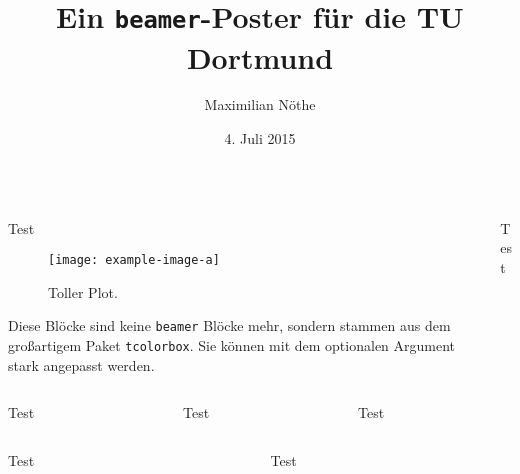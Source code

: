 \documentclass[t]{beamer}
\title{Ein \texttt{beamer}-Poster für die TU Dortmund}
\author{Maximilian Nöthe}
\date{4. Juli 2015}
\institute{%
  \texttt{[image: tudo.pdf]}%
}
\newlength{\thirdtextwidth}
\begin{document}
  \begin{columns}[onlytextwidth]%
    \begin{column}{0.5\textwidth}%
      \begin{block}[equal height group=A]{Test}%
        \begin{multicols}{2}
          \begin{figure}
            \texttt{[image: example-image-a]}\\
            \caption{Toller Plot.}
          \end{figure}
          \columnbreak
          Diese Blöcke sind keine \texttt{beamer} Blöcke mehr,
          sondern stammen aus dem großartigem Paket \texttt{tcolorbox}.
          Sie können mit dem optionalen Argument stark angepasst werden.
        \end{multicols}
      \end{block}%
    \end{column}%
    \begin{column}{0.5\textwidth}%
      \begin{alertblock}[equal height group=A]{Test}%
        \begin{multicols}{2}
          \blindtext
          \blindtext
        \end{multicols}
      \end{alertblock}%
    \end{column}%
  \end{columns}%
  \begin{columns}[c, onlytextwidth]%
    \begin{column}{\thirdtextwidth}%
      \begin{exampleblock}{Test}%
        \blindtext%
      \end{exampleblock}%
    \end{column}%
    \begin{column}{\thirdtextwidth}%
      \begin{block}{Test}%
        \blindtext%
      \end{block}%
    \end{column}%
    \begin{column}{\thirdtextwidth}%
      \begin{block}{Test}%
        \blindtext%
      \end{block}%
    \end{column}%
  \end{columns}%
  \begin{columns}[onlytextwidth]%
    \begin{column}{0.5\textwidth}%
      \begin{block}{Test}%
        \blindtext%
      \end{block}%
    \end{column}%
    \begin{column}{0.5\textwidth}%
      \begin{block}{Test}%
        \blindtext%
      \end{block}%
    \end{column}%
  \end{columns}%
\end{document}
